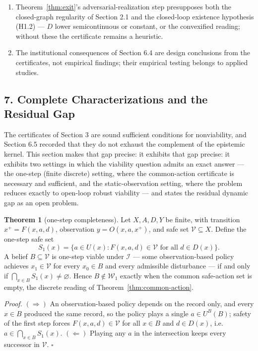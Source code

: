 \documentclass[10pt,twocolumn]{article}
\theoremstyle{definition}
\newtheorem{theorem}{Theorem}
\begin{document}
\begin{enumerate}
\item
  Theorem~\ref{thm:exit}'s adversarial-realization step presupposes both the closed-graph regularity of Section 2.1 and the closed-loop existence hypothesis (H1.2) --- \(D\) lower semicontinuous or constant, or the convexified reading; without these the certificate remains a heuristic.
\item
  The institutional consequences of Section 6.4 are design conclusions from the certificates, not empirical findings; their empirical testing belongs to applied studies.
\end{enumerate}




\subsection{7. Complete Characterizations and the Residual Gap}\label{complete-characterizations}

The certificates of Section 3 are sound sufficient conditions for nonviability, and Section 6.5 recorded that they do not exhaust the complement of the epistemic kernel. This section makes that gap precise: it exhibits that gap precise: it exhibits two settings in which the viability question admits an exact answer --- the one-step (finite discrete) setting, where the common-action certificate is necessary and sufficient, and the static-observation setting, where the problem reduces exactly to open-loop robust viability --- and states the residual dynamic gap as an open problem.

\begin{theorem}[one-step completeness]\label{thm:onestep}
Let \(X, A, D, Y\) be finite, with transition \(x^{+} = F(x,a,d)\), observation \(y = O(x,a,x^{+})\), and safe set \(\mathcal{V} \subseteq X\). Define the one-step safe set
\[
S_{1}(x) = \bigl\{ a \in U(x) : F(x,a,d) \in \mathcal{V} \text{ for all } d \in D(x) \bigr\}.
\]
A belief \(B \subseteq \mathcal{V}\) is one-step viable under \(\mathcal{I}\) --- some observation-based policy achieves \(x_{1} \in \mathcal{V}\) for every \(x_{0} \in B\) and every admissible disturbance --- if and only if \(\bigcap_{x \in B} S_{1}(x) \neq \varnothing\). Hence \(B \notin \mathcal{W}_{1}\) exactly when the common safe-action set is empty, the discrete reading of Theorem~\ref{thm:common-action}.
\end{theorem}

\emph{Proof.} \((\Rightarrow)\) An observation-based policy depends on the record only, and every \(x \in B\) produced the same record, so the policy plays a single \(a \in U^{B}(B)\); safety of the first step forces \(F(x,a,d) \in \mathcal{V}\) for all \(x \in B\) and \(d \in D(x)\), i.e.\ \(a \in \bigcap_{x \in B} S_{1}(x)\). \((\Leftarrow)\) Playing any \(a\) in the intersection keeps every successor in \(\mathcal{V}\). \hfill\(\square\)
\end{document}
